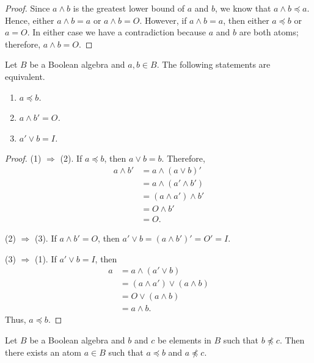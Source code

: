  
\begin{proof}
Since $a \wedge b$ is the greatest lower bound of $a$ and $b$, we know
that $a \wedge b \preceq a$.  Hence, either $a \wedge b = a$ or $a
\wedge b = O$. However, if $a \wedge b = a$, then either $a \preceq b$
or $a = O$.  In either case we have a contradiction because $a$ and
$b$ are both atoms; therefore, $a \wedge b = O$. 
\end{proof}
 
 
\begin{lemma}\label{boolean:PO_equivalent_lemma}
Let $B$ be a Boolean algebra and $a, b \in B$. The following 
statements are equivalent. 
\begin{enumerate}
 
\rm \item \it
$a \preceq b$.
 
\rm \item \it
$a \wedge b' = O$.
 
\rm \item \it
$a' \vee b = I$.
 
\end{enumerate}
\end{lemma}
 
 
\begin{proof}
(1) $\Rightarrow$ (2).
If $a \preceq b$, then $a \vee b = b$. Therefore,
\begin{align*} 
a \wedge b' & = a \wedge (a \vee b)' \\
& = a \wedge ( a' \wedge b') \\
& = ( a \wedge a') \wedge b' \\     
& = O \wedge b' \\
& = O.
\end{align*}
 
 
(2) $\Rightarrow$ (3).
If $a \wedge b' = O$, then $a' \vee b = (a \wedge b')' = O' = I$. 
 
 
(3) $\Rightarrow$ (1). 
If $a' \vee b = I$, then
\begin{align*}
a & =  a \wedge (a' \vee b)  \\
& =  (a \wedge a') \vee (a  \wedge  b) \\
& = O \vee (a  \wedge  b) \\
& = a \wedge b.
\end{align*}
Thus, $a \preceq b$.
\end{proof}
 
 
\begin{lemma}
Let $B$ be a Boolean algebra and $b$ and $c$ be elements in $B$ such
that $b \not\preceq c$. Then there exists an atom $a \in B$ such that
$a \preceq b$ and $a \not\preceq c$.
\end{lemma}
 
